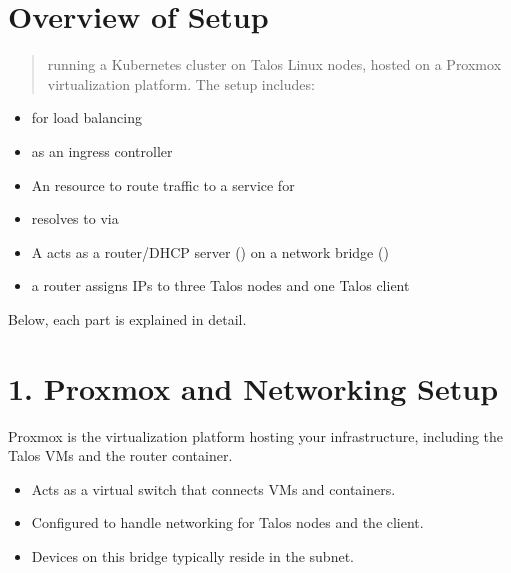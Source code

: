 \documentclass[letterpaper,10pt,english]{sphinxmanual}
\begin{document}
\section{Overview of  Setup}
\label{\detokenize{setup:overview-of-setup}}\begin{quote}

\sphinxAtStartPar
running a Kubernetes cluster on Talos Linux nodes, hosted on a Proxmox virtualization platform. The setup includes:
\end{quote}
\begin{itemize}
\item {} 
\sphinxAtStartPar
{} for load balancing

\item {} 
\sphinxAtStartPar
{} as an ingress controller

\item {} 
\sphinxAtStartPar
An  resource to route traffic to a service for 

\item {} 
\sphinxAtStartPar
{} resolves  to  via 

\item {} 
\sphinxAtStartPar
A  acts as a router/DHCP server () on a network bridge ()

\item {} 
\sphinxAtStartPar
a router assigns IPs to three Talos nodes and one Talos client

\end{itemize}

\sphinxAtStartPar
Below, each part is explained in detail.


\section{1. Proxmox and Networking Setup}
\label{\detokenize{setup:proxmox-and-networking-setup}}
\sphinxAtStartPar
Proxmox is the virtualization platform hosting your infrastructure, including the Talos VMs and the router container.

\sphinxAtStartPar
{}
\begin{itemize}
\item {} 
\sphinxAtStartPar
Acts as a virtual switch that connects VMs and containers.

\item {} 
\sphinxAtStartPar
Configured to handle networking for Talos nodes and the client.

\item {} 
\sphinxAtStartPar
Devices on this bridge typically reside in the  subnet.

\end{itemize}
\end{document}
